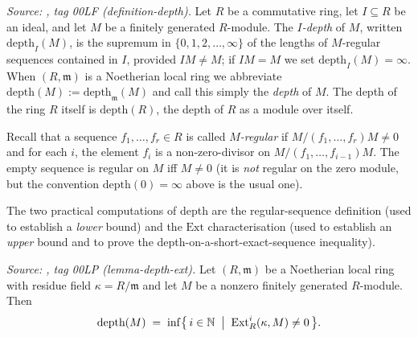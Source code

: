 \begin{definition}\leanok
  \label{def:depth}
  \textit{Source: \cite{stacks-project}, tag 00LF (definition-depth).}
  Let \(R\) be a commutative ring, let \(I \subseteq R\) be an ideal, and let \(M\) be a finitely
  generated \(R\)-module. The \emph{\(I\)-depth} of \(M\), written \(\text{depth}_I(M)\), is the
  supremum in \(\{0, 1, 2, \dots, \infty\}\) of the lengths of \(M\)-regular sequences contained
  in \(I\), provided \(IM \neq M\); if \(IM = M\) we set \(\text{depth}_I(M) = \infty\). When
  \((R, \mathfrak{m})\) is a Noetherian local ring we abbreviate
  \(\text{depth}(M) := \text{depth}_{\mathfrak{m}}(M)\) and call this simply the
  \emph{depth} of \(M\). The depth of the ring \(R\) itself is \(\text{depth}(R)\), the depth
  of \(R\) as a module over itself.
\end{definition}

Recall that a sequence \(f_1, \dots, f_r \in R\) is called \emph{\(M\)-regular} if
\(M/(f_1, \dots, f_r)M \neq 0\) and for each \(i\), the element \(f_i\) is a non-zero-divisor on
\(M/(f_1, \dots, f_{i-1})M\). The empty sequence is regular on \(M\) iff \(M \neq 0\) (it is
\emph{not} regular on the zero module, but the convention \(\text{depth}(0) = \infty\)
above is the usual one).

The two practical computations of depth are the regular-sequence definition (used to
establish a \emph{lower} bound) and the \(\text{Ext}\) characterisation (used to establish an
\emph{upper} bound and to prove the depth-on-a-short-exact-sequence inequality).

\begin{lemma}\leanok
  \label{lem:depth_via_ext}

  \textit{Source: \cite{stacks-project}, tag 00LP (lemma-depth-ext).}
  Let \((R, \mathfrak{m})\) be a Noetherian local ring with residue field
  \(\kappa = R/\mathfrak{m}\) and let \(M\) be a nonzero finitely generated \(R\)-module. Then
  \[
    \text{depth}(M) \;=\; \inf\bigl\{\, i \in \mathbb{N} \;\bigm|\; \text{Ext}^i_R(\kappa, M) \neq 0 \,\bigr\}.
  \]
\end{lemma}

